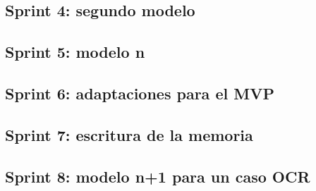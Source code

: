 \subsection{Sprint 4: segundo modelo}
\subsection{Sprint 5: modelo n}
\subsection{Sprint 6: adaptaciones para el MVP}
\subsection{Sprint 7: escritura de la memoria}
\subsection{Sprint 8: modelo n+1 para un caso OCR}



